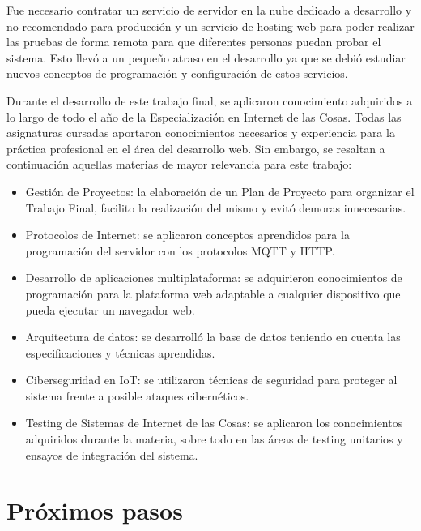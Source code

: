 Fue necesario contratar un servicio de servidor en la nube dedicado a desarrollo y no recomendado para producción y un servicio de hosting web para poder realizar las pruebas de forma remota para que diferentes personas puedan probar el sistema. Esto llevó a un pequeño atraso en el desarrollo ya que se debió estudiar nuevos conceptos de programación y configuración de estos servicios. 

Durante el desarrollo de este trabajo final, se aplicaron conocimiento adquiridos a lo largo de todo el año de la Especialización en Internet de las Cosas. Todas las asignaturas cursadas aportaron conocimientos necesarios y experiencia para la práctica profesional en el área del desarrollo web.  Sin embargo, se resaltan a continuación aquellas materias de mayor relevancia para este trabajo:

\begin{itemize}
	\item Gestión de Proyectos: la elaboración de un Plan de Proyecto para organizar el Trabajo Final, facilito la realización del mismo y evitó demoras innecesarias. 
	\item Protocolos de Internet: se aplicaron conceptos aprendidos para la programación del servidor con los protocolos MQTT y HTTP.
	\item Desarrollo de aplicaciones multiplataforma: se adquirieron conocimientos de programación para la plataforma web adaptable a cualquier dispositivo que pueda ejecutar un navegador web.
	\item Arquitectura de datos: se desarrolló la base de datos teniendo en cuenta las especificaciones y técnicas aprendidas. 
	\item Ciberseguridad en IoT: se utilizaron técnicas de seguridad para proteger al sistema frente a posible ataques cibernéticos. 
	\item Testing de Sistemas de Internet de las Cosas: se aplicaron los conocimientos adquiridos durante la materia, sobre todo en las áreas de testing unitarios y ensayos de integración del sistema.
\end{itemize}


\section{Próximos pasos}

